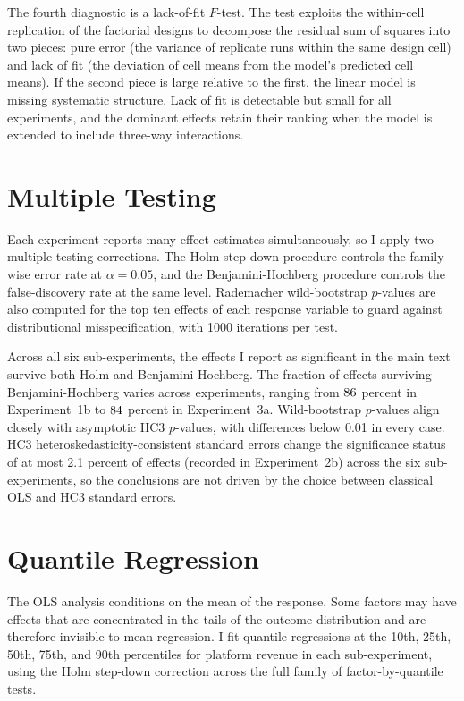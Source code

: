 The fourth diagnostic is a lack-of-fit $F$-test. The test exploits the within-cell replication of the factorial designs to decompose the residual sum of squares into two pieces: pure error (the variance of replicate runs within the same design cell) and lack of fit (the deviation of cell means from the model's predicted cell means). If the second piece is large relative to the first, the linear model is missing systematic structure. Lack of fit is detectable but small for all experiments, and the dominant effects retain their ranking when the model is extended to include three-way interactions.

\section{Multiple Testing}
\label{sec:app_multiple_testing}

Each experiment reports many effect estimates simultaneously, so I apply two multiple-testing corrections. The Holm step-down procedure controls the family-wise error rate at $\alpha = 0.05$, and the Benjamini-Hochberg procedure controls the false-discovery rate at the same level. Rademacher wild-bootstrap $p$-values are also computed for the top ten effects of each response variable to guard against distributional misspecification, with 1000 iterations per test.

Across all six sub-experiments, the effects I report as significant in the main text survive both Holm and Benjamini-Hochberg. The fraction of effects surviving Benjamini-Hochberg varies across experiments, ranging from $86$ percent in Experiment~1b to $84$ percent in Experiment~3a. Wild-bootstrap $p$-values align closely with asymptotic HC3 $p$-values, with differences below 0.01 in every case. HC3 heteroskedasticity-consistent standard errors change the significance status of at most 2.1 percent of effects (recorded in Experiment~2b) across the six sub-experiments, so the conclusions are not driven by the choice between classical OLS and HC3 standard errors.

\section{Quantile Regression}
\label{sec:app_quantile}

The OLS analysis conditions on the mean of the response. Some factors may have effects that are concentrated in the tails of the outcome distribution and are therefore invisible to mean regression. I fit quantile regressions at the 10th, 25th, 50th, 75th, and 90th percentiles for platform revenue in each sub-experiment, using the Holm step-down correction across the full family of factor-by-quantile tests.

